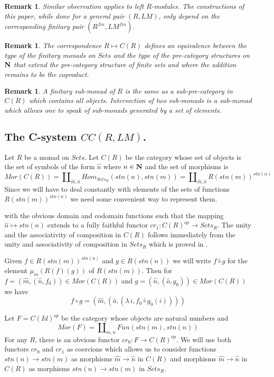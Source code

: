 \documentclass[11pt]{article}
\newtheorem{remark}[proposition]{Remark}
\newcommand{\sr}{\rightarrow}
\newcommand{\nn}{{\bf N\rm}}
\newcommand{\wh}{\widehat}
\newcommand{\hc}{\wh{\circ}}
\begin{document}
{\begin{remark}
Similar observation applies to left $R$-modules. The constructions of this paper, while done for a general pair $(R,LM)$, only depend on the corresponding finitary pair $(R^{fin},LM^{fin})$. 
\end{remark}
%
\begin{remark}\rm
The correspondence $R\mapsto {C(R)}$ defines an equivalence between the type of the finitary monads on $Sets$ and the type of the pre-category structures on $\nn$ that extend the pre-category structure of finite sets and where the addition remains to be the coproduct. 
\end{remark}
%
\begin{remark}\rm A finitary sub-monad of $R$ is the same as a sub-pre-category in ${C(R)}$ which contains all objects. Intersection of two sub-monads is a sub-monad which allows one to speak of sub-monads generated by a set of elements. 
\end{remark}

}



\subsection{The C-system $CC(R,LM)$.}
%
Let $R$ be a monad on $Sets$. Let $C(R)$ be the category whose set of objects is the set of symbols of the form $\wh{n}$ where $n\in \nn$ and the set of morphisms is 
%
$$Mor(C(R))=\amalg_{\wh{m},\wh{n}}Hom_{Sets_R}(stn(n),stn(m))=\amalg_{\wh{m},\wh{n}} R(stn(m))^{stn(n)}$$
%
Since we will have to deal constantly with elements of the sets of functions $R(stn(m))^{stn(n)}$ we need some convenient way to represent them. 



with the obvious domain and codomain functions such that the mapping $\wh{n}\mapsto stn(n)$ extends to a fully faithful functor $cr_1:C(R)^{op}\sr Sets_R$. The unity and the associativity of composition in $C(R)$ follows immediately from the unity and associativity of composition in $Sets_R$ which is proved in \cite{Kleisli}. 

Given $f\in R(stn(m))^{stn(n)}$ and $g\in R(stn(n))$ we will write $f\hc g$ for the element $\mu_m(R(f)(g))$ of $R(stn(m))$. Then for $f=(\wh{m},(\wh{n},f_0))\in Mor(C(R))$ and $g=(\wh{n},(\wh{o},g_0))\in Mor(C(R))$ we have
%
$$f\circ g=(\wh{m},(\wh{o},(\lambda\,i,f_0\hc g_0(i))))$$
%






Let $F=C(Id)^{op}$ be the category whose objects are natural numbers and
%
$$Mor(F)=\amalg_{m,n}Fun(stn(m),stn(n))$$
%
For any $R$, there is an obvious functor $cr_0:F\sr C(R)^{op}$. 
%
We will use both functors $cr_0$ and $cr_1$ as coercions which allows us to consider functions $stn(n)\sr stn(m)$ as morphisms $\wh{m}\sr \wh{n}$ in $C(R)$ and morphisms $\wh{m}\sr \wh{n}$ in $C(R)$ as morphisms $stn(n)\sr stn(m)$ in $Sets_R$. 
\end{document}
